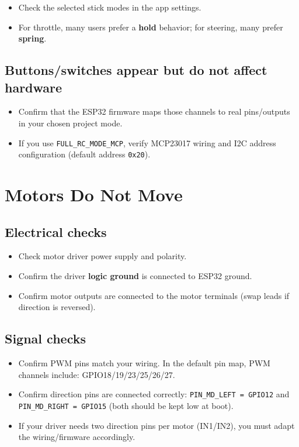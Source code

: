 \begin{itemize}
    \item Check the selected stick modes in the app settings.
    \item For throttle, many users prefer a \textbf{hold} behavior; for steering, many prefer \textbf{spring}.
\end{itemize}

\subsection*{Buttons/switches appear but do not affect hardware}
\begin{itemize}
    \item Confirm that the ESP32 firmware maps those channels to real pins/outputs in your chosen project mode.
    \item If you use \texttt{FULL\_RC\_MODE\_MCP}, verify MCP23017 wiring and I2C address configuration (default address \texttt{0x20}).
\end{itemize}

\section{Motors Do Not Move}
\label{sec:motors}

\subsection*{Electrical checks}
\begin{itemize}
    \item Check motor driver power supply and polarity.
    \item Confirm the driver \textbf{logic ground} is connected to ESP32 ground.
    \item Confirm motor outputs are connected to the motor terminals (swap leads if direction is reversed).
\end{itemize}

\subsection*{Signal checks}
\begin{itemize}
    \item Confirm PWM pins match your wiring. In the default pin map, PWM channels include:
    GPIO18/19/23/25/26/27.
    \item Confirm direction pins are connected correctly:
    \texttt{PIN\_MD\_LEFT = GPIO12} and \texttt{PIN\_MD\_RIGHT = GPIO15} (both should be kept low at boot).
    \item If your driver needs two direction pins per motor (IN1/IN2), you must adapt the wiring/firmware accordingly.
\end{itemize}

